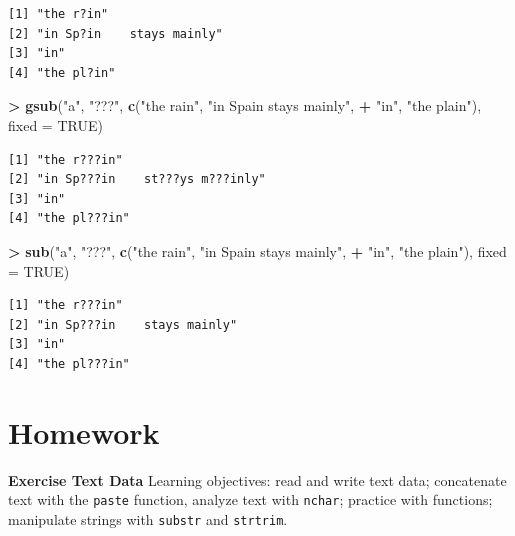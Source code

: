 \documentclass[]{krantz}
\makeatletter
\newenvironment{Shaded}{\begin{snugshade}}{\end{snugshade}}
\newcommand{\DataTypeTok}[1]{\textcolor[rgb]{0.27,0.27,0.27}{#1}}
\newcommand{\KeywordTok}[1]{\textcolor[rgb]{0.27,0.27,0.27}{\textbf{#1}}}
\newcommand{\NormalTok}[1]{#1}
\newcommand{\OperatorTok}[1]{\textcolor[rgb]{0.43,0.43,0.43}{\textbf{#1}}}
\newcommand{\OtherTok}[1]{\textcolor[rgb]{0.37,0.37,0.37}{#1}}
\newcommand{\StringTok}[1]{\textcolor[rgb]{0.5,0.5,0.5}{#1}}
\newenvironment{kframe}{%
\medskip{}
\setlength{\fboxsep}{.8em}
 \def\at@end@of@kframe{}%
 \ifinner\ifhmode%
  \def\at@end@of@kframe{\end{minipage}}%
  \begin{minipage}{\columnwidth}%
 \fi\fi%
 \def\FrameCommand##1{\hskip\@totalleftmargin \hskip-\fboxsep
 \colorbox{shadecolor}{##1}\hskip-\fboxsep
     \hskip-\linewidth \hskip-\@totalleftmargin \hskip\columnwidth}%
 \MakeFramed {\advance\hsize-\width
   \@totalleftmargin\z@ \linewidth\hsize
   \@setminipage}}%
 {\par\unskip\endMakeFramed%
 \at@end@of@kframe}
\renewenvironment{Shaded}{\begin{kframe}}{\end{kframe}}
\makeatother
\begin{document}
\begin{verbatim}
[1] "the r?in"                
[2] "in Sp?in    stays mainly"
[3] "in"                      
[4] "the pl?in"               
\end{verbatim}

\begin{Shaded}
\begin{Highlighting}[]
\OperatorTok{>}\StringTok{ }\KeywordTok{gsub}\NormalTok{(}\StringTok{"a"}\NormalTok{, }\StringTok{"???"}\NormalTok{, }\KeywordTok{c}\NormalTok{(}\StringTok{"the rain"}\NormalTok{, }\StringTok{"in Spain    stays mainly"}\NormalTok{, }
\OperatorTok{+}\StringTok{   "in"}\NormalTok{, }\StringTok{"the plain"}\NormalTok{), }\DataTypeTok{fixed =} \OtherTok{TRUE}\NormalTok{)}
\end{Highlighting}
\end{Shaded}

\begin{verbatim}
[1] "the r???in"                    
[2] "in Sp???in    st???ys m???inly"
[3] "in"                            
[4] "the pl???in"                   
\end{verbatim}

\begin{Shaded}
\begin{Highlighting}[]
\OperatorTok{>}\StringTok{ }\KeywordTok{sub}\NormalTok{(}\StringTok{"a"}\NormalTok{, }\StringTok{"???"}\NormalTok{, }\KeywordTok{c}\NormalTok{(}\StringTok{"the rain"}\NormalTok{, }\StringTok{"in Spain    stays mainly"}\NormalTok{, }
\OperatorTok{+}\StringTok{   "in"}\NormalTok{, }\StringTok{"the plain"}\NormalTok{), }\DataTypeTok{fixed =} \OtherTok{TRUE}\NormalTok{)}
\end{Highlighting}
\end{Shaded}

\begin{verbatim}
[1] "the r???in"                
[2] "in Sp???in    stays mainly"
[3] "in"                        
[4] "the pl???in"               
\end{verbatim}

\hypertarget{homework-7}{%
\section{Homework}\label{homework-7}}

\textbf{Exercise Text Data} Learning objectives: read and write text data; concatenate text with the \texttt{paste} function, analyze text with \texttt{nchar}; practice with functions; manipulate strings with \texttt{substr} and \texttt{strtrim}.
\end{document}
